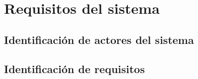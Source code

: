\chapter{Requisitos del sistema}
\label{ch:requisitos}

\section{Identificación de actores del sistema}



\section{Identificación de requisitos}

